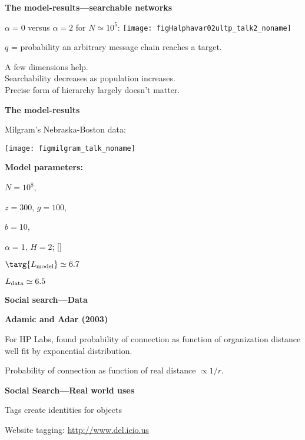   


   \textbf{The model-results---searchable networks}
 
   $\alpha=0$ versus $\alpha=2$ for $N \simeq 10^5$:
   \centering
   \texttt{[image: figHalphavar02ultp\_talk2\_noname]}%

$q$ = probability an arbitrary message
chain reaches a target.


 A few dimensions help.\\
 Searchability decreases as population increases.\\
 Precise form of hierarchy largely doesn't matter.



 
  \textbf{The model-results}

  Milgram's Nebraska-Boston data:

      
    \texttt{[image: figmilgram\_talk\_noname]}%
    
    \textbf{Model parameters:}
      
      
        $N=10^8$, 
      
        $z=300$, $g=100$,
      
        $b=10$,  
      
        $\alpha=1$, $H=2$; 
      []
      
        $\tavg{L_{\textnormal{model}}} \simeq 6.7$
      
        ${L_{\textnormal{data}}} \simeq 6.5$
      
    
  

  \textbf{Social search---Data}

  \textbf{Adamic and Adar (2003)}
    
    
      For HP Labs, found probability of connection
      as function of organization distance
      well fit by exponential distribution.
    
      Probability of connection as function of
      real distance $\propto 1/r$.
    
  


  \textbf{Social Search---Real world uses}

  
   
  Tags create identities for objects
   
  Website tagging:
  \url{http://www.del.icio.us}
   
